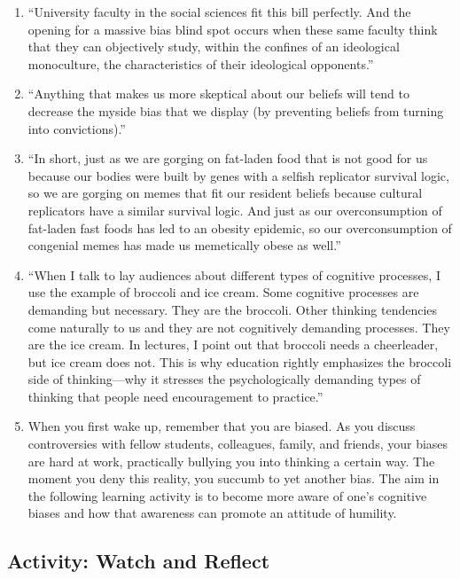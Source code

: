 \documentclass[
]{book}
\begin{document}
\begin{enumerate}
\item
  ``University faculty in the social sciences fit this bill perfectly. And the opening for a massive bias blind spot occurs when these same faculty think that they can objectively study, within the confines of an ideological monoculture, the characteristics of their ideological opponents.''\\
\item
  ``Anything that makes us more skeptical about our beliefs will tend to decrease the myside bias that we display (by preventing beliefs from turning into convictions).''\\
\item
  ``In short, just as we are gorging on fat-laden food that is not good for us because our bodies were built by genes with a selfish replicator survival logic, so we are gorging on memes that fit our resident beliefs because cultural replicators have a similar survival logic. And just as our overconsumption of fat-laden fast foods has led to an obesity epidemic, so our overconsumption of congenial memes has made us memetically obese as well.''\\
\item
  ``When I talk to lay audiences about different types of cognitive processes, I use the example of broccoli and ice cream. Some cognitive processes are demanding but necessary. They are the broccoli. Other thinking tendencies come naturally to us and they are not cognitively demanding processes. They are the ice cream. In lectures, I point out that broccoli needs a cheerleader, but ice cream does not. This is why education rightly emphasizes the broccoli side of thinking---why it stresses the psychologically demanding types of thinking that people need encouragement to practice.''\\
\item
  When you first wake up, remember that you are biased. As you discuss controversies with fellow students, colleagues, family, and friends, your biases are hard at work, practically bullying you into thinking a certain way. The moment you deny this reality, you succumb to yet another bias. The aim in the following learning activity is to become more aware of one's cognitive biases and how that awareness can promote an attitude of humility.
\end{enumerate}

\hypertarget{activity-watch-and-reflect-3}{%
\subsection*{Activity: Watch and Reflect}\label{activity-watch-and-reflect-3}}
\end{document}
